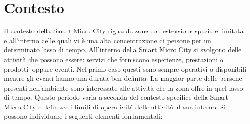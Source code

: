 \section{Contesto}
Il contesto della Smart Micro City riguarda zone con estensione spaziale limitata e all'interno delle quali vi è una alta concentrazione di persone per un determinato lasso di tempo.
All'interno della Smart Micro City si svolgono delle attività che possono essere: servizi che forniscono esperienze, prestazioni o prodotti, oppure eventi. Nel primo caso questi sono sempre operativi o disponibili mentre gli eventi hanno una durata ben definita.
La maggior parte delle persone presenti nell’ambiente sono interessate alle attività che la zona offre in quel lasso di tempo. Questo periodo varia a seconda del contesto specifico della Smart Micro City e definisce i limiti di operatività delle attività al suo interno.
Si possono individuare i seguenti elementi fondamentali:
